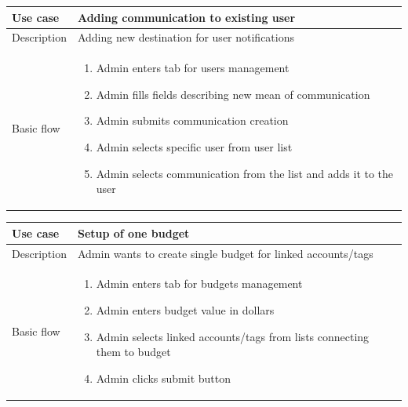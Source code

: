 \documentclass[licencjacka,en]{thesisclass}
\begin{document}
    \begin{center}
      \begin{tabular} {| l | p{13cm} |}
      \hline
      Use case & Adding communication to existing user \\ \hline
      Description & Adding new destination for user notifications \\ \hline
      Basic flow &
        \begin{enumerate}
        \item Admin enters tab for users management
        \item Admin fills fields describing new mean of communication
        \item Admin submits communication creation
        \item Admin selects specific user from user list
        \item Admin selects communication from the list and adds it to the user
        \end{enumerate}
        \\ \hline
      \end{tabular}
    \end{center}

    \begin{center}
      \begin{tabular} {| l | p{13cm} |}
      \hline
      Use case & Setup of one budget \\ \hline
      Description & Admin wants to create single budget for linked accounts/tags \\ \hline
      Basic flow &
        \begin{enumerate}
        \item Admin enters tab for budgets management
        \item Admin enters budget value in dollars
        \item Admin selects linked accounts/tags from lists connecting them to budget
        \item Admin clicks submit button
        \end{enumerate}
        \\ \hline
      \end{tabular}
    \end{center}
\end{document}
